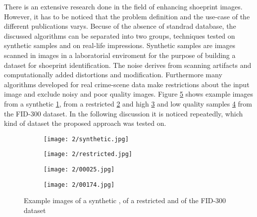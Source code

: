 \documentclass[draft,final]{vutinfth} %
\begin{document}
\par
There is an extensive research done in the field of enhancing shoeprint images.
However, it has to be noticed that the problem definition and the use-case of the different publications varys.
Becuse of the absence of standrad database, the discussed algorithms can be separated into two groups, techniques tested on synthetic samples and on real-life impressions.
Synthetic samples are images scanned in images in a laboratorial enviroment for the purpose of building a dataset for shoeprint identification.
The noise derives from scanning artifacts and computationally added distortions and modification.
Furthermore many algorithms developed for real crime-scene data make restrictions about the input image and exclude noisy and poor quality images.
Figure \ref{fig:rw:database} shows example images from a synthetic \ref{fig:rw:synthetic}, from a restricted \ref{fig:rw:restricted} and high \ref{fig:rw:highFID} and low quality samples \ref{fig:rw:lowFID} from the FID-300 dataset.
In the following discussion it is noticed repeatedly, which kind of dataset the proposed approach was tested on.

\begin{figure}[h]
  \centering
  \begin{subfigure}[b]{0.24\columnwidth}
    \centering
    \texttt{[image: 2/synthetic.jpg]}
    \label{fig:rw:synthetic}
  \end{subfigure}
  \begin{subfigure}[b]{0.24\columnwidth}
    \centering
    \texttt{[image: 2/restricted.jpg]}
    \label{fig:rw:restricted}
  \end{subfigure}
  \begin{subfigure}[b]{0.24\columnwidth}
    \centering
    \texttt{[image: 2/00025.jpg]}
    \label{fig:rw:highFID}
  \end{subfigure}
  \begin{subfigure}[b]{0.24\columnwidth}
    \centering
    \texttt{[image: 2/00174.jpg]}
    \label{fig:rw:lowFID}
  \end{subfigure}
  \caption{Example images of a synthetic \cite{alizadeh2017automatic}, of a restricted \cite{li2014retrieval} and of the FID-300 \cite{kortylewski2014unsupervised} dataset}
  \label{fig:rw:database}
\end{figure}
\end{document}
